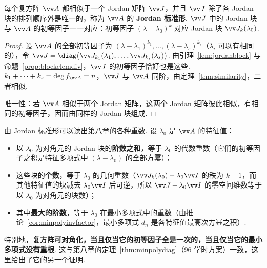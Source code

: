 	\begin{theorem}\label{thm:jordan}
		每个复方阵 $\vv A$ 都相似于一个 Jordan 矩阵 $\vv J$，并且 $\vv J$ 除了各 Jordan 块的排列顺序外是唯一的，称为 $\vv A$ 的 \textbf{Jordan 标准形}. $\vv J$ 中的 Jordan 块与 $\vv A$ 的初等因子一一对应：初等因子 $(\lambda-\lambda_0)^k$ 对应 Jordan 块 $\vv J_k(\lambda_0)$.
	\end{theorem}
	\begin{proof}
		设 $\vv A$ 的全部初等因子为 $(\lambda-\lambda_1)^{k_1},\ldots,(\lambda-\lambda_s)^{k_s}$（$\lambda_i$ 可以有相同的），令 $\vv J=\diag\big(\vv J_{k_1}(\lambda_1),\ldots,\vv J_{k_s}(\lambda_s)\big)$. 由引理~\ref{lem:jordanblock} 与命题~\ref{prop:blockelemdiv}，$\vv J$ 的初等因子恰好也是这些. $k_1+\cdots+k_s=\deg f_{\vv A}=n$，$\vv J$ 与 $\vv A$ 同阶，由定理~\ref{thm:similarity}，二者相似.
		
		唯一性：若 $\vv A$ 相似于两个 Jordan 矩阵，这两个 Jordan 矩阵彼此相似，有相同的初等因子，因而由同样的 Jordan 块组成.
	\end{proof}
	
	由 Jordan 标准形可以读出第八章的各种重数. 设 $\lambda_0$ 是 $\vv A$ 的特征值：
	\begin{itemize}
		\item 以 $\lambda_0$ 为对角元的 Jordan 块的\textbf{阶数之和}，等于 $\lambda_0$ 的代数重数（它们的初等因子之积是特征多项式中 $(\lambda-\lambda_0)$ 的全部方幂）；
		\item 这些块的\textbf{个数}，等于 $\lambda_0$ 的几何重数（$\vv J_k(\lambda_0)-\lambda_0\vv I$ 的秩为 $k-1$，而其他特征值的块减去 $\lambda_0\vv I$ 后可逆，所以 $\vv J-\lambda_0\vv I$ 的零空间维数等于以 $\lambda_0$ 为对角元的块数）；
		\item 其中\textbf{最大的阶数}，等于 $\lambda_0$ 在最小多项式中的重数（由推论~\ref{cor:minpolyinvfactor}，最小多项式 $d_n$ 是各特征值最高次方幂之积）.
	\end{itemize}
	特别地，\textbf{复方阵可对角化，当且仅当它的初等因子全是一次的，当且仅当它的最小多项式没有重根}. 这与第八章的定理~\ref{thm:minpolydiag}（96 学时方案）一致，这里给出了它的另一个证明.%
	
